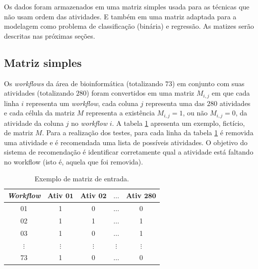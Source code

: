 \documentclass[10pt,letterpaper]{article}
\begin{document}
Os dados foram armazenados em uma matriz simples usada para as técnicas que não usam ordem das atividades. E também em uma matriz adaptada para a modelagem como problema de classificação (binária) e regressão. As matizes serão descritas nas próximas seções.

\subsection*{Matriz simples}
Os \emph{workflows} da área de bioinformática (totalizando \(73\)) em conjunto com suas atividades (totalizando \(280\)) foram convertidos em uma matriz \(M_{i,j}\) em que cada linha \(i\) representa um \emph{workflow}, cada coluna \(j\) representa uma das \(280\) atividades e cada célula da matriz \(M\) representa a existência \(M_{i,j} = 1\), ou não \(M_{i,j} = 0\), da atividade da coluna \(j\) no \emph{workflow} \(i\). A tabela \ref{tabela_matriz_de_dados} apresenta um exemplo, fictício, de matriz \(M\). Para a realização dos testes, para cada linha da tabela \ref{tabela_matriz_de_dados} é removida uma atividade e é recomendada uma lista de possíveis atividades. O objetivo do sistema de recomendação é identificar corretamente qual a atividade está faltando no workflow (isto é, aquela que foi removida). 
\begin{table}[htb]
	\centering
	\caption{Exemplo de matriz de entrada.}
	\begin{tabular}{|c|c|c|c|c|}  \hline
		\textbf{\emph{Workflow}} & \textbf{Ativ \(\mathbf{01}\)} & \textbf{Ativ \(\mathbf{02}\)} & \textbf{\(\mathbf{\ldots}\)} & \textbf{Ativ \(\mathbf{280}\)}  \\ \hline
		01 			  & 1 			  & 0 			  & \(\ldots\) 	  & 0  				\\ \hline
		02 			  & 1 			  & 1 			  & \(\ldots\) 	  & 1  				\\ \hline
		03 			  & 1 			  & 0 			  & \(\ldots\) 	  & 1  				\\ \hline
		\(\vdots\) 		  			  & \(\vdots\) 	  & \(\vdots\) 	  & \(\vdots\) 	  & \(\vdots\) 		\\ \hline
		73 			  & 1 			  & 0 			  & \(\ldots\) 	  & 0  				\\ \hline
	\end{tabular}
	\label{tabela_matriz_de_dados}
	\vspace{0.1cm}
\end{table}
\end{document}
